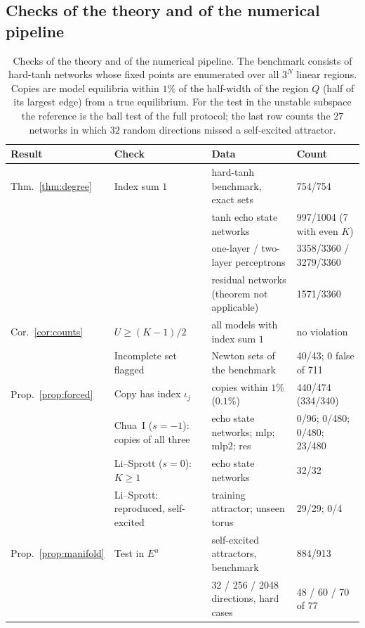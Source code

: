 \documentclass[aip,cha,reprint,amsmath,amssymb,longbibliography]{revtex4-2}
\theoremstyle{definition}
\begin{document}
\subsection{Checks of the theory and of the numerical pipeline}
\label{sec:theory_checks}

\begin{table}
\caption{Checks of the theory and of the numerical pipeline. The benchmark consists of hard-tanh networks whose fixed
points are enumerated over all $3^N$ linear regions. Copies are model equilibria within $1\%$ of the half-width of the
region $Q$ (half of its largest edge) from a true equilibrium. For the test in the unstable subspace the reference is the ball test of the full protocol;
the last row counts the $27$ networks in which $32$ random directions missed a self-excited attractor.}
\label{tab:theory}
\begin{ruledtabular}
\begin{tabular}{llll}
Result & Check & Data & Count \\
\hline
Thm.~\ref{thm:degree} & Index sum $1$ & hard-tanh benchmark, exact sets & 754/754 \\
 &  & tanh echo state networks & 997/1004 (7 with even $K$) \\
 &  & one-layer / two-layer perceptrons & 3358/3360 / 3279/3360 \\
 &  & residual networks (theorem not applicable) & 1571/3360 \\
Cor.~\ref{cor:counts} & $U\ge(K-1)/2$ & all models with index sum $1$ & no violation \\
 & Incomplete set flagged & Newton sets of the benchmark & 40/43; 0 false of 711 \\
Prop.~\ref{prop:forced} & Copy has index $\iota_j$ & copies within $1\%$ ($0.1\%$) & 440/474 (334/340) \\
 & Chua~I ($s=-1$): copies of all three & echo state networks; mlp; mlp2; res & 0/96; 0/480; 0/480; 23/480 \\
 & Li--Sprott ($s=0$): $K\ge1$ & echo state networks & 32/32 \\
 & Li--Sprott: reproduced, self-excited & training attractor; unseen torus & 29/29; 0/4 \\
Prop.~\ref{prop:manifold} & Test in $E^u$ & self-excited attractors, benchmark & 884/913 \\
 &  & 32 / 256 / 2048 directions, hard cases & 48 / 60 / 70 of 77 \\
\end{tabular}
\end{ruledtabular}
\end{table}
\end{document}
